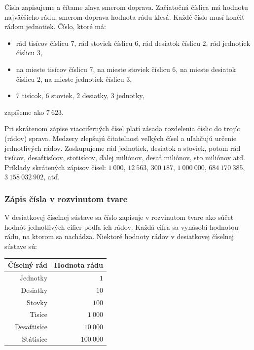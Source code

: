 \documentclass{report}
\begin{document}
Čísla zapisujeme a čítame zľava smerom doprava. Začiatočná číslica má hodnotu najväčšieho rádu, smerom doprava hodnota rádu klesá. Každé číslo musí končiť rádom jednotiek. Číslo, ktoré má:
\begin{itemize}
  \item rád tisícov číslicu \(7\), rád stoviek číslicu \(6\), rád desiatok číslicu \(2\), rád jednotiek číslicu \(3\),
  \item na mieste tisícov číslicu \(7\), na mieste stoviek číslicu \(6\), na mieste desiatok číslicu \(2\), na mieste jednotiek číslicu \(3\),
  \item \(7\) tisícok, \(6\) stoviek, \(2\) desiatky, \(3\) jednotky,
\end{itemize}
zapíšeme ako \(7\ 623\).

Pri skrátenom zápise viacciferných čísel platí zásada rozdelenia číslic do trojíc (rádov) sprava. Medzery zlepšujú čitateľnosť veľkých čísel a uľahčujú určenie jednotlivých rádov. Zoskupujeme rád jednotiek, desiatok a stoviek, potom rád tisícov, desaťtisícov, stotisícov, ďalej miliónov, desať miliónov, sto miliónov atď. Príklady skrátených zápisov čísel: \(1\ 000\), \(12\ 563\), \(300\ 187\), \(1\ 000\ 000\), \(684\ 170\ 385\), \(3\ 158\ 032\ 902\), atď.

\subsubsection{Zápis čísla v rozvinutom tvare}

V desiatkovej číselnej sústave sa číslo zapisuje v rozvinutom tvare ako súčet hodnôt jednotlivých cifier podľa ich rádov. Každá cifra sa vynásobí hodnotou rádu, na ktorom sa nachádza. Niektoré hodnoty rádov v desiatkovej číselnej sústave sú:

\begin{table}[H]
  \centering
  \renewcommand{\arraystretch}{1.2}
  \begin{tabular}{|r|r|}
    \hline
    \textbf{Číselný rád} & \textbf{Hodnota rádu} \\
    \hline
    Jednotky & \(1\) \\
    \hline
    Desiatky & \(10\) \\
    \hline
    Stovky & \(100\) \\
    \hline
    Tisíce & \(1\ 000\) \\
    \hline
    Desaťtisíce & \(10\ 000\) \\
    \hline
    Státisíce & \(100\ 000\) \\
    \hline
  \end{tabular}
\end{table}
\end{document}
